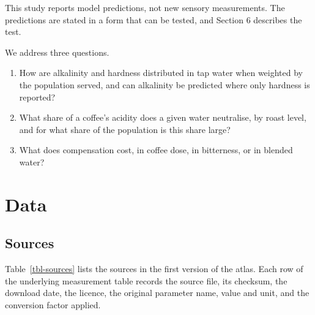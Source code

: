 \documentclass[
  a4paper,
]{article}
\providecommand{\tightlist}{%
  \setlength{\itemsep}{0pt}\setlength{\parskip}{0pt}}
\begin{document}
This study reports model predictions, not new sensory measurements. The
predictions are stated in a form that can be tested, and Section 6
describes the test.

We address three questions.

\begin{enumerate}
\def\labelenumi{\arabic{enumi}.}
\tightlist
\item
  How are alkalinity and hardness distributed in tap water when weighted
  by the population served, and can alkalinity be predicted where only
  hardness is reported?
\item
  What share of a coffee's acidity does a given water neutralise, by
  roast level, and for what share of the population is this share large?
\item
  What does compensation cost, in coffee dose, in bitterness, or in
  blended water?
\end{enumerate}

\section{Data}\label{data}

\subsection{Sources}\label{sources}

Table~\ref{tbl-sources} lists the sources in the first version of the
atlas. Each row of the underlying measurement table records the source
file, its checksum, the download date, the licence, the original
parameter name, value and unit, and the conversion factor applied.
\end{document}
